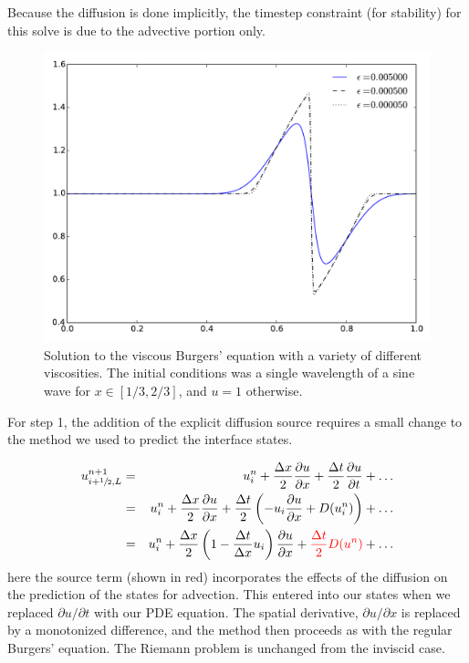 Because the diffusion is done implicitly, the timestep constraint (for
stability) for this solve is due to the advective portion only.

\begin{figure}[t]
\centering
\includegraphics[width=5in]{burgersvisc}
\caption[Viscous Burgers' equation solution]
  {\label{fig:viscburger} Solution to the viscous Burgers' equation
  with a variety of different viscosities.  The initial conditions was
  a single wavelength of a sine wave for $x \in [1/3,2/3]$, and $u = 1$
  otherwise. \\
  }
\end{figure}

For step 1, the addition of the explicit diffusion source requires
a small change to the method we used to predict the interface states.

\begin{eqnarray}
u^{n+1}_{i+{\sfrac{1}{2}},L} &=& u^n_i + \frac{\Delta x}{2} \frac{\partial u}{\partial x}
                        + \frac{\Delta t}{2} \frac{\partial u}{\partial t} + \ldots \\
                &=& u^n_i + \frac{\Delta x}{2} \frac{\partial u}{\partial x}
                        + \frac{\Delta t}{2} \left (-u_i \frac{\partial u}{\partial x} + D(u^n_i) \right ) + \ldots \\
                &=& u^n_i + \frac{\Delta x}{2} \left ( 1 - \frac{\Delta t}{\Delta x}u_i \right ) \frac{\partial u}{\partial x} + {\color{red} \frac{\Delta t}{2} D(u^n) } + \ldots
\end{eqnarray}
here the source term (shown in red) incorporates the effects of the
diffusion on the prediction of the states for advection.  This entered
into our states when we replaced $\partial u/\partial t$ with our PDE
equation.  The spatial derivative, $\partial u/\partial x$ is replaced
by a monotonized difference, and the method then proceeds as with the
regular Burgers' equation.  The Riemann problem is unchanged from the
inviscid case.

